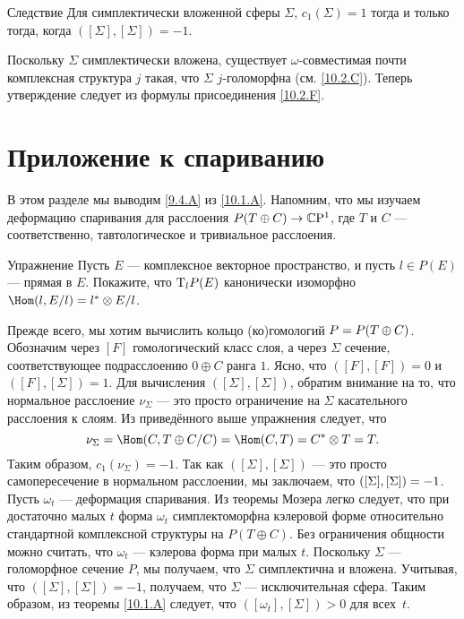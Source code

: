 \begin{thm*}{Следствие} Для симплектически вложенной сферы $\Sigma$,
   $c_1(\Sigma) = 1$ тогда и только тогда, когда $([\Sigma], [\Sigma]) = -1$. 
\end{thm*}

Поскольку $\Sigma$ симплектически вложена, существует
$\omega$-совместимая почти комплексная структура $j$ такая, что
$\Sigma$ $j$-голоморфна (см. \ref{10.2.C}). 
Теперь утверждение следует из формулы присоединения \ref{10.2.F}. 
\qeds


\section{Приложение к спариванию}

В этом разделе мы выводим \ref{9.4.A} из \ref{10.1.A}.
Напомним, что мы изучаем деформацию спаривания для расслоения $P(T
\oplus C) \to \mathbb{C}\mathrm{P}^1$, где $T$ и $C$ --- соответственно,
тавтологическое и тривиальное расслоения. 

\begin{ex*}{Упражнение}
Пусть $E$ --- комплексное векторное пространство, и пусть $l \in P(E)$
--- прямая в $E$. 
Покажите, что $\mathrm{T}_l P(E)$ канонически изоморфно $\Hom(l, E/l) = l^\ast \otimes E/l$.
\end{ex*}

Прежде всего, мы хотим вычислить кольцо (ко)гомологий $P \z= P(T \oplus C)$.
Обозначим через $[F]$ гомологический класс слоя, а через $\Sigma$
сечение, соответствующее подрасслоению $0\oplus C$ ранга $1$. 
Ясно, что $([F], [F]) = 0$ и $([F], [\Sigma]) = 1$.
Для вычисления $([\Sigma], [\Sigma])$, обратим внимание на то, что
нормальное расслоение $\nu_\Sigma$ --- это просто ограничение на
$\Sigma$ касательного расслоения к слоям. 
Из приведённого выше упражнения следует, что 
\[\nu_\Sigma = \Hom(C, T \oplus C/C) = \Hom(C, T) = C^\ast \otimes T = T.\]
Таким образом, $c_1 (\nu_\Sigma) = -1$. 
Так как $([\Sigma], [\Sigma])$ --- это просто самопересечение в нормальном расслоении,
мы заключаем, что $([\Sigma], [\Sigma]) \z= -1$.
Пусть $\omega_t$ --- деформация спаривания.
Из теоремы Мозера \cite{MS} легко следует, что при достаточно малых
$t$ форма $\omega_t$ симплектоморфна кэлеровой форме относительно
стандартной комплексной структуры на $P(T \oplus C)$. 
Без ограничения общности можно считать, что $\omega_t$ --- кэлерова
форма при малых $t$. 
Поскольку $\Sigma$ --- голоморфное сечение $P$, мы получаем, что
$\Sigma$ симплектична и вложена. 
Учитывая, что $([\Sigma], [\Sigma]) = -1$, получаем, что $\Sigma$ ---
исключительная сфера. 
Таким образом, из теоремы \ref{10.1.A} следует, что $([\omega_t],
[\Sigma]) > 0$ для всех~$t$. 

